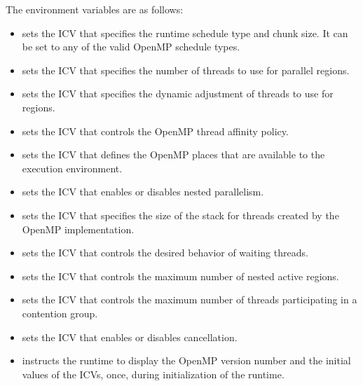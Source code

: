 The environment variables are as follows:

\begin{itemize}
\item {} sets the  ICV that specifies the runtime schedule type 
and chunk size. It can be set to any of the valid OpenMP schedule types.

\item {} sets the  ICV that specifies the number of threads 
to use for parallel regions.

\item {} sets the  ICV that specifies the dynamic adjustment of 
threads to use for  regions.

\item {} sets the  ICV that controls the OpenMP thread affinity 
policy. 

\item {} sets the  ICV that defines the OpenMP places that 
are available to the execution environment.

\item {} sets the  ICV that enables or disables nested parallelism.

\item {} sets the  ICV that specifies the size of the stack for 
threads created by the OpenMP implementation.

\item {} sets the  ICV that controls the desired behavior 
of waiting threads. 

\item {} sets the  ICV that controls the 
maximum number of nested active  regions. 

\item {} sets the  ICV that controls the maximum 
number of threads participating in a contention group.

\item {} sets the  ICV that enables or disables cancellation.

\item {} instructs the runtime to display the OpenMP version number 
and the initial values of the ICVs, once, during initialization of the runtime.


\end{itemize}
